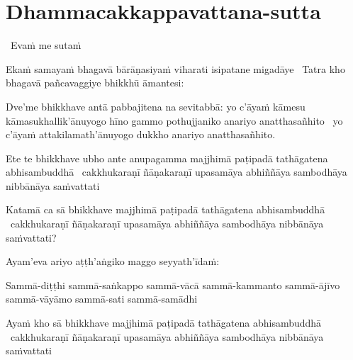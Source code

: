 \section{Dhammacakkappavattana-sutta}
\label{dhammacakkappavattana-full}

\begin{leader}
  \anglebracketleft\ \hspace{-0.5mm}Evaṁ me sutaṁ \hspace{-0.5mm}\anglebracketright\
\end{leader}

\begin{pali-hang}
  Ekaṁ samayaṁ bhagavā bārāṇasiyaṁ viharati isipatane migadāye \breathmark\ Tatra kho bhagavā pañcavaggiye bhikkhū āmantesi:
\end{pali-hang}

\begin{pali-hang}
  Dve'me bhikkhave antā pabbajitena na sevitabbā: yo c'āyaṁ kāmesu kāmasukhallik'ānuyogo hīno gammo pothujjaniko anariyo anatthasañhito \breathmark\ yo c'āyaṁ attakilamath'ānuyogo dukkho anariyo anatthasañhito.
\end{pali-hang}

\begin{pali-hang}
  Ete te bhikkhave ubho ante anupagamma majjhimā paṭipadā tathāgatena abhisambuddhā \breathmark\ cakkhukaraṇī ñāṇakaraṇī upasamāya abhiññāya sambodhāya nibbānāya saṁvattati
\end{pali-hang}

\begin{pali-hang}
  Katamā ca sā bhikkhave majjhimā paṭipadā tathāgatena abhisambuddhā \breathmark\ cakkhukaraṇī ñāṇakaraṇī upasamāya abhiññāya sambodhāya nibbānāya saṁvattati?
\end{pali-hang}

\begin{pali-hang}
  Ayam'eva ariyo aṭṭh'aṅgiko maggo seyyath'īdaṁ:
\end{pali-hang}

\begin{pali-hang}
  Sammā-diṭṭhi sammā-saṅkappo sammā-vācā sammā-kammanto sammā-ājīvo sammā-vāyāmo sammā-sati sammā-samādhi
\end{pali-hang}

\begin{pali-hang}
  Ayaṁ kho sā bhikkhave majjhimā paṭipadā tathāgatena abhisambuddhā \breathmark\ cakkhukaraṇī ñāṇakaraṇī upasamāya abhiññāya sambodhāya nibbānāya saṁvattati
\end{pali-hang}

